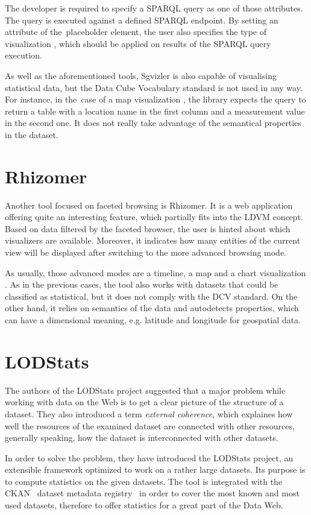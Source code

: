 The developer is required to specify a SPARQL query as one of those attributes. The 
query is executed against a defined SPARQL endpoint. By setting an attribute of
the~placeholder element, the user also specifies the type of visualization , which 
should be applied on results of the SPARQL query execution.

As well as the aforementioned tools, Sgvizler is also capable of visualising statistical data, 
but the Data Cube Vocabulary standard is not used in any way. For instance, in 
the~case of a map visualization , the library expects the query to return a table 
with a location name in the first column and a measurement value in the second 
one. It does not really take advantage of the semantical properties in the 
dataset.

\section{Rhizomer}
Another tool focused on faceted browsing is Rhizomer. It is a web application 
offering quite an interesting feature, which partially fits into the LDVM 
concept. Based on data filtered by the faceted browser, the user is hinted about
which visualizers are available. Moreover, 
it indicates how many entities of the current view will be displayed after 
switching to the more advanced browsing mode.

As usually, those advanced modes are a timeline, a map and a chart visualization . As 
in the previous cases, the tool also works with datasets that could be 
classified as statistical, but it does not comply with the DCV standard. On the 
other hand, it relies on semantics of the data and autodetects properties, 
which can have a dimensional meaning, e.g. latitude and longitude for geospatial data.

\section{LODStats}
The authors of the LODStats project suggested that a major 
problem while working with data on the Web is to get a clear picture of the 
structure of a dataset. They also introduced a term \emph{external coherence},
which explaines how well the resources of the examined dataset are connected with 
other resources, generally speaking, how the dataset is interconnected with 
other datasets.

In order to solve the problem, they have introduced the LODStats project, an 
extensible framework optimized to work on a rather large datasets. Its purpose 
is to compute statistics on the given datasets. The tool is integrated with the 
CKAN~\cite{ckan} dataset metadata registry~\cite{thedatahub} in order to cover the most known and 
most used datasets, therefore to offer statistics for a great part of the Data 
Web.

